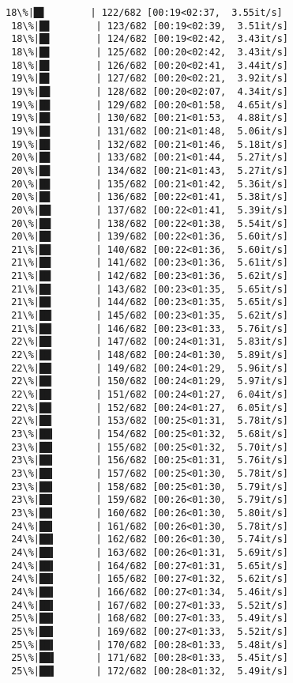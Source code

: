 \documentclass[11pt]{article}
\begin{document}
\begin{Verbatim}[commandchars=\\\{\}]
 18\%|█▊        | 122/682 [00:19<02:37,  3.55it/s]
 18\%|█▊        | 123/682 [00:19<02:39,  3.51it/s]
 18\%|█▊        | 124/682 [00:19<02:42,  3.43it/s]
 18\%|█▊        | 125/682 [00:20<02:42,  3.43it/s]
 18\%|█▊        | 126/682 [00:20<02:41,  3.44it/s]
 19\%|█▊        | 127/682 [00:20<02:21,  3.92it/s]
 19\%|█▉        | 128/682 [00:20<02:07,  4.34it/s]
 19\%|█▉        | 129/682 [00:20<01:58,  4.65it/s]
 19\%|█▉        | 130/682 [00:21<01:53,  4.88it/s]
 19\%|█▉        | 131/682 [00:21<01:48,  5.06it/s]
 19\%|█▉        | 132/682 [00:21<01:46,  5.18it/s]
 20\%|█▉        | 133/682 [00:21<01:44,  5.27it/s]
 20\%|█▉        | 134/682 [00:21<01:43,  5.27it/s]
 20\%|█▉        | 135/682 [00:21<01:42,  5.36it/s]
 20\%|█▉        | 136/682 [00:22<01:41,  5.38it/s]
 20\%|██        | 137/682 [00:22<01:41,  5.39it/s]
 20\%|██        | 138/682 [00:22<01:38,  5.54it/s]
 20\%|██        | 139/682 [00:22<01:36,  5.60it/s]
 21\%|██        | 140/682 [00:22<01:36,  5.60it/s]
 21\%|██        | 141/682 [00:23<01:36,  5.61it/s]
 21\%|██        | 142/682 [00:23<01:36,  5.62it/s]
 21\%|██        | 143/682 [00:23<01:35,  5.65it/s]
 21\%|██        | 144/682 [00:23<01:35,  5.65it/s]
 21\%|██▏       | 145/682 [00:23<01:35,  5.62it/s]
 21\%|██▏       | 146/682 [00:23<01:33,  5.76it/s]
 22\%|██▏       | 147/682 [00:24<01:31,  5.83it/s]
 22\%|██▏       | 148/682 [00:24<01:30,  5.89it/s]
 22\%|██▏       | 149/682 [00:24<01:29,  5.96it/s]
 22\%|██▏       | 150/682 [00:24<01:29,  5.97it/s]
 22\%|██▏       | 151/682 [00:24<01:27,  6.04it/s]
 22\%|██▏       | 152/682 [00:24<01:27,  6.05it/s]
 22\%|██▏       | 153/682 [00:25<01:31,  5.78it/s]
 23\%|██▎       | 154/682 [00:25<01:32,  5.68it/s]
 23\%|██▎       | 155/682 [00:25<01:32,  5.70it/s]
 23\%|██▎       | 156/682 [00:25<01:31,  5.76it/s]
 23\%|██▎       | 157/682 [00:25<01:30,  5.78it/s]
 23\%|██▎       | 158/682 [00:25<01:30,  5.79it/s]
 23\%|██▎       | 159/682 [00:26<01:30,  5.79it/s]
 23\%|██▎       | 160/682 [00:26<01:30,  5.80it/s]
 24\%|██▎       | 161/682 [00:26<01:30,  5.78it/s]
 24\%|██▍       | 162/682 [00:26<01:30,  5.74it/s]
 24\%|██▍       | 163/682 [00:26<01:31,  5.69it/s]
 24\%|██▍       | 164/682 [00:27<01:31,  5.65it/s]
 24\%|██▍       | 165/682 [00:27<01:32,  5.62it/s]
 24\%|██▍       | 166/682 [00:27<01:34,  5.46it/s]
 24\%|██▍       | 167/682 [00:27<01:33,  5.52it/s]
 25\%|██▍       | 168/682 [00:27<01:33,  5.49it/s]
 25\%|██▍       | 169/682 [00:27<01:33,  5.52it/s]
 25\%|██▍       | 170/682 [00:28<01:33,  5.48it/s]
 25\%|██▌       | 171/682 [00:28<01:33,  5.45it/s]
 25\%|██▌       | 172/682 [00:28<01:32,  5.49it/s]

\end{Verbatim}
\end{document}

